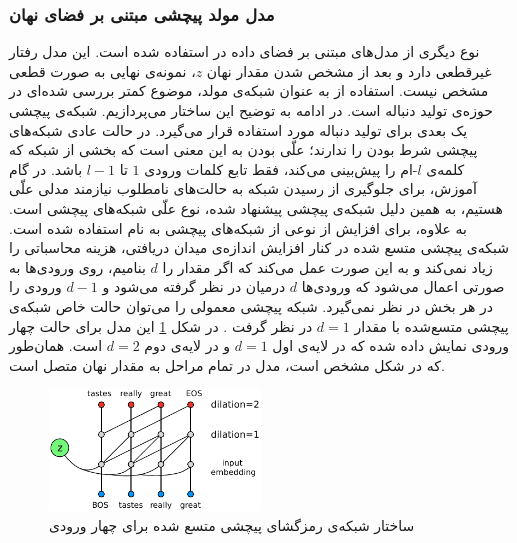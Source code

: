  \subsubsection{مدل‌ مولد پیچشی مبتنی بر فضای نهان}\label{Model:Generative:Latent:CNN}
نوع دیگری از مدل‌های مبتنی بر فضای داده در 
\cite{Yang2017ImprovedVAE}
استفاده شده است. این مدل رفتار غیرقطعی دارد و بعد از مشخص شدن مقدار نهان $z$، نمونه‌ی نهایی به صورت قطعی مشخص نیست. 
استفاده از
به عنوان شبکه‌ی مولد، موضوع کمتر بررسی شده‌ای در حوزه‌ی تولید دنباله است. در ادامه به توضیح این ساختار می‌پردازیم.
\newline
شبکه‌ی پیچشی یک بعدی برای تولید دنباله مورد استفاده قرار می‌گیرد. در حالت عادی شبکه‌های پیچشی شرط 
بودن را ندارند؛ علّی بودن به این معنی است که بخشی از شبکه که کلمه‌ی $l$-ام را پیش‌بینی می‌کند، فقط تابع کلمات ورودی $1$ تا $l-1$ باشد. در گام آموزش، برای جلوگیری از رسیدن شبکه به حالت‌های نامطلوب نیازمند مدلی علّی هستیم، به همین دلیل شبکه‌ی پیچشی پیشنهاد شده، نوع علّی شبکه‌های پیچشی است.
\newline
به علاوه، برای افزایش 
از نوعی از شبکه‌های پیچشی به نام 
استفاده شده است.
شبکه‌ی پیچشی متسع شده در کنار افزایش اندازه‌ی میدان دریافتی، هزینه محاسباتی را زیاد نمی‌کند و به این صورت عمل می‌کند که اگر مقدار 
را
$d$
بنامیم، 
روی ورودی‌ها به صورتی اعمال می‌شود که ورودی‌ها
$d$
در‌میان در نظر گرفته می‌شود و
$d-1$
ورودی را در هر بخش در نظر نمی‌گیرد.  شبکه پیچشی معمولی را می‌توان حالت خاص شبکه‌ی پیچشی متسع‌شده با مقدار
$d=1$
در نظر گرفت
\cite{yu2015multi}.
در شکل 
\ref{Figure:GenrativeModel:Architecture:CNNLatent:Det:Zall}
این مدل برای حالت چهار ورودی  نمایش داده شده که در لایه‌ی اول  
$d=1$
و در لایه‌ی دوم
$d=2$
است. همان‌طور که در شکل مشخص است، مدل در تمام مراحل به مقدار نهان متصل است.
  \begin{figure}[!htb]
  	\centering
  	\includegraphics[width=0.5\textwidth]{images/ArchitectureImprovedVAEDecoder.pdf} 
  	\caption[ساختار شبکه‌ی رمزگشای پیچشی متسع شده ]
  	{ساختار شبکه‌ی رمزگشای پیچشی متسع شده برای چهار ورودی
	  		 \cite{Yang2017ImprovedVAE}
  		 }
  	\label{Figure:GenrativeModel:Architecture:CNNLatent:Det:Zall}
  \end{figure}
  
